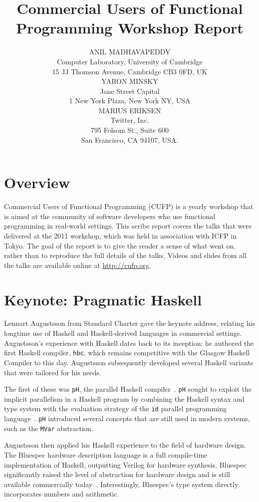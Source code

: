 \documentclass{jfp1}
\title[Commercial Users of Functional Programming 2011]
      {Commercial Users of Functional Programming Workshop Report}
\author[Anil Madhavapeddy, Yaron Minsky and Marius Eriksen]
       {ANIL MADHAVAPEDDY\\
        Computer Laboratory, University of Cambridge\\ 
        15 JJ Thomson Avenue, Cambridge CB3 0FD, UK\\
 YARON MINSKY\\
        Jane Street Capital\\
        1 New York Plaza, New York NY, USA\\ 
 MARIUS ERIKSEN\\
        Twitter, Inc.\\
        795 Folsom St., Suite 600\\
        San Francisco, CA 94107, USA.
        }
\begin{document}
\label{firstpage}
\maketitle

\section{Overview}

Commercial Users of Functional Programming (CUFP) is a yearly workshop
that is aimed at the community of software developers who use functional
programming in real-world settings.  This scribe report covers the talks
that were delivered at the 2011 workshop, which was held in association
with ICFP in Tokyo.  The goal of the report is to give the reader
a sense of what went on, rather than to reproduce the full details
of the talks.  Videos and slides from all the talks are available online at \url{http://cufp.org}.

\section{Keynote: Pragmatic Haskell}

Lennart Augustsson from Standard Charter gave the keynote address,
relating his longtime use of Haskell and Haskell-derived languages in
commercial settings.  Augustsson's experience with Haskell dates back to
its inception: he authored the first Haskell compiler, {\tt hbc}, which
remains competitive with the Glasgow Haskell Compiler to this
day. Augustsson subsequently developed several Haskell variants that were
tailored for his needs.

The first of these was {\tt pH}, the parallel Haskell
compiler~\cite{Aditya95semanticsof}. {\tt pH} sought to exploit the implicit
parallelism in a Haskell program by combining the Haskell syntax and type
system with the evaluation strategy of the {\tt id} parallel programming
language~\cite{arvindid}.  {\tt pH} introduced several concepts that are still
used in modern systems, such as the {\tt MVar} abstraction.

Augustsson then applied his Haskell experience to the field of hardware
design.  The Bluespec hardware description language is a full compile-time
implementation of Haskell, outputting Verilog for hardware synthesis.  Bluespec
significantly raised the level of abstraction for hardware design and is still
available commercially today~\cite{Nikhil:2008:BLU:1862867.1862868}. Interestingly,
Bluespec's type system directly incorporates numbers and arithmetic.
\end{document}
